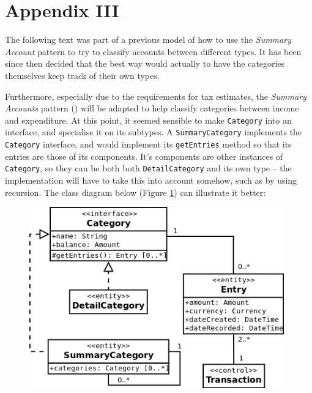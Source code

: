 \section{Appendix III} \label{appendix3}

The following text was part of a previous model of how to use the \emph{Summary
Account} pattern to try to classify accounts between different types. It has
been since then decided that the best way would actually to have the categories
themselves keep track of their own types.

Furthermore, especially due to the requirements for tax estimates, the
\emph{Summary Accounts} pattern (\cite[][Section~6.3]{fowler1997analysis}) will
be adapted to help classify categories between income and expenditure. At this
point, it seemed sensible to make \texttt{Category} into an interface, and
specialise it on its subtypes. A \texttt{SummaryCategory} implements the
\texttt{Category} interface, and would implement its \texttt{getEntries} method
so that its entries are those of its components. It's components are other
instances of \texttt{Category}, so they can be both both
\texttt{DetailCategory} and its own type -- the implementation will have to
take this into account somehow, such as by using recursion. The class diagram
below (Figure \ref{fig:ClassDiagram.SummaryCategory}) can illustrate it better:

\begin{figure}[ht!]
  \begin{center}
    \includegraphics[width=11cm]{./contents/img/Class_Diagram_-_Summary_Category.png}
  \end{center}
  \caption{}
  \label{fig:ClassDiagram.SummaryCategory}
\end{figure}
\FloatBarrier

